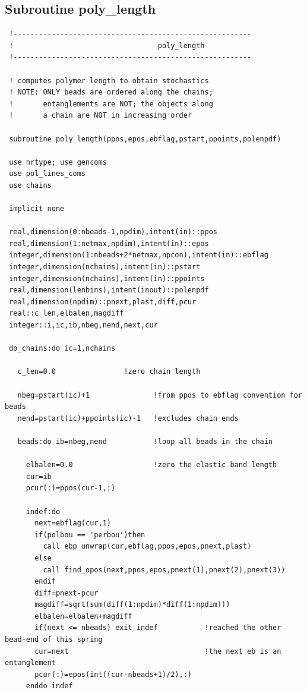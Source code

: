 \documentclass[]{article}
\begin{document}
\subsection{Subroutine poly\_length}
\begin{verbatim}
 !--------------------------------------------------------
 !                                  poly_length
 !--------------------------------------------------------
 
 ! computes polymer length to obtain stochastics
 ! NOTE: ONLY beads are ordered along the chains;
 !       entanglements are NOT; the objects along
 !       a chain are NOT in increasing order
 
 subroutine poly_length(ppos,epos,ebflag,pstart,ppoints,polenpdf)
 
 use nrtype; use gencoms 
 use pol_lines_coms
 use chains
 
 implicit none
 
 real,dimension(0:nbeads-1,npdim),intent(in)::ppos
 real,dimension(1:netmax,npdim),intent(in)::epos
 integer,dimension(1:nbeads+2*netmax,npcon),intent(in)::ebflag
 integer,dimension(nchains),intent(in)::pstart
 integer,dimension(nchains),intent(in)::ppoints
 real,dimension(lenbins),intent(inout)::polenpdf
 real,dimension(npdim)::pnext,plast,diff,pcur
 real::c_len,elbalen,magdiff
 integer::i,ic,ib,nbeg,nend,next,cur
 
 do_chains:do ic=1,nchains
 
   c_len=0.0                !zero chain length
 
   nbeg=pstart(ic)+1               !from ppos to ebflag convention for beads
   nend=pstart(ic)+ppoints(ic)-1   !excludes chain ends
 
   beads:do ib=nbeg,nend           !loop all beads in the chain
 
     elbalen=0.0                   !zero the elastic band length
     cur=ib
     pcur(:)=ppos(cur-1,:)
 
     indef:do
       next=ebflag(cur,1)
       if(polbou == 'perbou')then
         call ebp_unwrap(cur,ebflag,ppos,epos,pnext,plast)
       else
         call find_opos(next,ppos,epos,pnext(1),pnext(2),pnext(3))
       endif
       diff=pnext-pcur
       magdiff=sqrt(sum(diff(1:npdim)*diff(1:npdim)))
       elbalen=elbalen+magdiff
       if(next <= nbeads) exit indef           !reached the other bead-end of this spring
       cur=next                                !the next eb is an entanglement
       pcur(:)=epos(int((cur-nbeads+1)/2),:)
     enddo indef
 

\end{verbatim}
\end{document}
